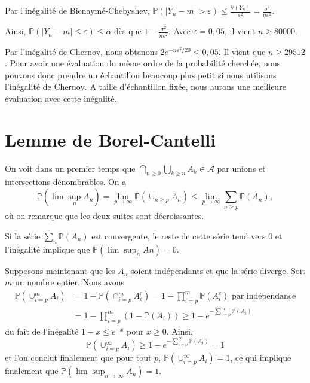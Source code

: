 \label{IV-answer-idc3}
Par l'inégalité de Bienaymé-Chebyshev,
\(\mathbb{P}(|Y_n - m| > \varepsilon) \leq \frac{\mathbb{V}(Y_n)}{\varepsilon^2} = \frac{\sigma^2}{n\varepsilon^2}\).

Ainsi, \(\mathbb{P}(|Y_n - m| \leq \varepsilon)\leq \alpha\) dès que
\(1-\frac{\sigma^2}{n\varepsilon^2}\). Avec \(\varepsilon = 0,05\), il
vient \(n \geq 80000\).

Par l'inégalité de Chernov, nous obtenons
\(2e^{- n\varepsilon^2/20} \leq 0, 05\). Il vient que \(n \geq 29512\).
Pour avoir une évaluation du même ordre de la probabilité cherchée, nous
pouvons donc prendre un échantillon beaucoup plus petit si nous
utilisons l'inégalité de Chernov. A taille d'échantillon fixée, nous
aurons une meilleure évaluation avec cette inégalité.

\section{Lemme de Borel-Cantelli}\label{IV-lemme-de-borel-cantelli-1}

\label{IV-answer-bc1}
On voit dans un premier temps que
\(\bigcap_{n\geq 0} \bigcup_{k \geq n} A_k \in \mathcal{A}\) par unions
et intersections dénombrables. On a
\[\mathbb{P}(\lim \sup_n A_n ) = \lim_{p \to \infty} \mathbb{P}(\cup_{n\geq p} A_n) \leq \lim_{p \to \infty} \sum_{n \geq p} \mathbb{P}(A_n),\]
où on remarque que les deux suites sont décroissantes.

Si la série \(\sum_n \mathbb{P}(A_n)\) est convergente, le reste de
cette série tend vers 0 et l'inégalité implique que
\(\mathbb{P}(\lim \sup_n A n) = 0\).

\label{IV-answer-bc2}
Supposons maintenant que les \(A_n\) soient indépendants et que la série
diverge. Soit \(m\) un nombre entier. Nous avons \begin{align*}
\mathbb{P}(\cup_{i=p}^m A_i) &= 1- \mathbb{P}(\cap_{i=p}^m A_i^c) = 1- \prod_{i=p}^m \mathbb{P}(A_i^c) \text{ par indépendance}\\
& = 1- \prod_{i=p}^m (1-\mathbb{P}(A_i)) \geq 1- e^{-\sum_{i=p}^m\mathbb{P}(A_i)}
\end{align*} du fait de l'inégalité \(1 - x \leq e^{-x}\) pour
\(x \geq 0\). Ainsi,
\[ \mathbb{P}(\cup_{i=p}^{\infty} A_i) \geq 1- e^{-\sum_{i=p}^{\infty} \mathbb{P}(A_i)} = 1 \]
et l'on conclut finalement que pour tout \(p\),
\(\mathbb{P}(\cup_{i=p}^{\infty} A_i) = 1\), ce qui implique finalement
que \(\mathbb{P}(\lim \sup_{n \to \infty} A_n) = 1\).

